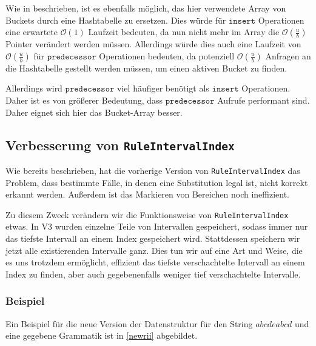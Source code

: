 Wie in \cite{dinklage_engineering_2021} beschrieben, ist es ebenfalls möglich, das hier verwendete Array von Buckets durch eine Hashtabelle zu ersetzen. Dies würde für $\texttt{insert}$ Operationen eine erwartete $\mathcal{O}(1)$ Laufzeit bedeuten, da nun nicht mehr im Array die $\mathcal{O}(\tfrac{u}{b})$ Pointer verändert werden müssen. Allerdings würde dies auch eine Laufzeit von $\mathcal{O}(\tfrac{u}{b})$ für $\texttt{predecessor}$ Operationen bedeuten, da potenziell $\mathcal{O}(\tfrac{u}{b})$ Anfragen an die Hashtabelle gestellt werden müssen, um einen aktiven Bucket zu finden. 

Allerdings wird $\texttt{predecessor}$ viel häufiger benötigt als $\texttt{insert}$ Operationen. Daher ist es von größerer Bedeutung, dass $\texttt{predecessor}$ Aufrufe performant sind. Daher eignet sich hier das Bucket-Array besser.


\subsection{Verbesserung von \texttt{RuleIntervalIndex}}

Wie bereits beschrieben, hat die vorherige Version von \texttt{RuleIntervalIndex} das Problem, dass bestimmte Fälle, in denen eine Substitution legal ist, nicht korrekt erkannt werden. Außerdem ist das Markieren von Bereichen noch ineffizient.  

Zu diesem Zweck verändern wir die Funktionsweise von \texttt{RuleIntervalIndex} etwas. In V3 wurden einzelne Teile von Intervallen gespeichert, sodass immer nur das tiefste Intervall an einem Index gespeichert wird.
Stattdessen speichern wir jetzt alle existierenden Intervalle ganz. Dies tun wir auf eine Art und Weise, die es uns trotzdem ermöglicht, effizient das tiefste verschachtelte Intervall an einem Index zu finden, aber auch gegebenenfalls weniger tief verschachtelte Intervalle. 

\subsubsection{Beispiel}

Ein Beispiel für die neue Version der Datenstruktur für den String $abcdeabcd$ und eine gegebene Grammatik ist in \autoref{newrii} abgebildet.

